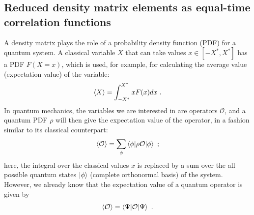 \subsection{Reduced density matrix elements as equal-time correlation functions}\label{rdmCorr}
A density matrix plays the role of a probability density function (PDF) for a quantum system. A classical variable $ X $ that can take values $ x \in [-X^*, X^*] $ has a PDF $ F(X=x) $, which is used, for example, for calculating the average value (expectation value) of the variable:
\begin{equation}\begin{aligned}
\braket{X} = \int_{-X^*}^{X^*} xF(x)dx ~.
\end{aligned}\end{equation}
In quantum mechanics, the variables we are interested in are operators $ \mathcal{O} $, and a quantum PDF $ \rho $ will then give the expectation value of the operator, in a fashion similar to its classical counterpart:
\begin{equation}\begin{aligned}
\braket{\mathcal{O}} = \sum_{\phi} \braket{\phi | \rho \mathcal{O} | \phi} ~;
\end{aligned}\end{equation}
here, the integral over the classical values $ x $ is replaced by a sum over the all possible quantum states $ \ket{\phi} $ (complete orthonormal basis) of the system. However, we already know that the expectation value of a quantum operator is given by
\begin{equation}\begin{aligned}
\braket{\mathcal{O}} = \braket{\Psi | \mathcal{O} | \Psi} ~.
\end{aligned}\end{equation}

